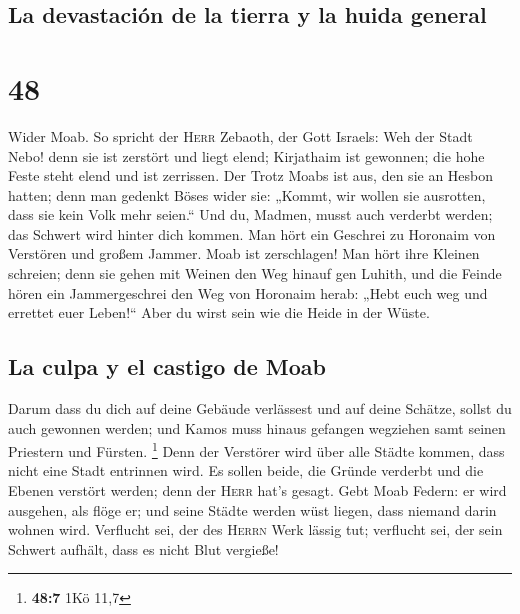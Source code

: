 \hypertarget{la-devastaciuxf3n-de-la-tierra-y-la-huida-general}{%
\subsection{La devastación de la tierra y la huida
general}\label{la-devastaciuxf3n-de-la-tierra-y-la-huida-general}}

\hypertarget{section-47}{%
\section{48}\label{section-47}}

 Wider Moab. So spricht der \textsc{Herr} Zebaoth, der
Gott Israels: Weh der Stadt Nebo! denn sie ist zerstört und liegt elend;
Kirjathaim ist gewonnen; die hohe Feste steht elend und ist zerrissen.
 Der Trotz Moabs ist aus, den sie an Hesbon hatten; denn
man gedenkt Böses wider sie: „Kommt, wir wollen sie ausrotten, dass sie
kein Volk mehr seien.`` Und du, Madmen, musst auch verderbt werden; das
Schwert wird hinter dich kommen.  Man hört ein Geschrei zu
Horonaim von Verstören und großem Jammer.  Moab ist
zerschlagen! Man hört ihre Kleinen schreien;  denn sie
gehen mit Weinen den Weg hinauf gen Luhith, und die Feinde hören ein
Jammergeschrei den Weg von Horonaim herab:  „Hebt euch weg
und errettet euer Leben!{}`` Aber du wirst sein wie die Heide in der
Wüste.

\hypertarget{la-culpa-y-el-castigo-de-moab}{%
\subsection{La culpa y el castigo de
Moab}\label{la-culpa-y-el-castigo-de-moab}}

 Darum dass du dich auf deine Gebäude verlässest und auf
deine Schätze, sollst du auch gewonnen werden; und Kamos muss hinaus
gefangen wegziehen samt seinen Priestern und Fürsten. \footnote{\textbf{48:7}
  1Kö 11,7}  Denn der Verstörer wird über alle Städte
kommen, dass nicht eine Stadt entrinnen wird. Es sollen beide, die
Gründe verderbt und die Ebenen verstört werden; denn der \textsc{Herr}
hat's gesagt.  Gebt Moab Federn: er wird ausgehen, als
flöge er; und seine Städte werden wüst liegen, dass niemand darin wohnen
wird.  Verflucht sei, der des \textsc{Herrn} Werk lässig
tut; verflucht sei, der sein Schwert aufhält, dass es nicht Blut
vergieße!


